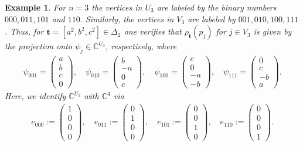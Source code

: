 \documentclass[a4paper]{amsart}
\newcommand{\C}{\mathbb{C}}
\newtheorem{example}[thm]{Example}
\begin{document}
\begin{example}
    \label{hyp::example:representation_rho_t_for_the_cube_Q3}
    For $n=3$ the vertices in $U_3$ are labeled by the binary numbers $000, 011, 101$ and $110$. Similarly, the vertices in $V_3$ are labeled by $001, 010, 100, 111$. Thus, for $\mathbf{t} = [a^2, b^2, c^2] \in \Delta_2$ one verifies that $\rho_\mathbf{t}(p_j)$ for $j \in V_3$ is given by the projection onto $\psi_j \in \C^{U_3}$, respectively, where
    \begin{align*}
        \psi_{001} = \begin{pmatrix}
            a \\ b \\ c \\ 0
        \end{pmatrix},
        \quad
        \psi_{010} = \begin{pmatrix}
            b \\ - a \\ 0 \\ c
        \end{pmatrix},
        \quad
        \psi_{100} = \begin{pmatrix}
            c \\ 0 \\ - a \\ - b
        \end{pmatrix},
        \quad
        \psi_{111} = \begin{pmatrix}
            0 \\ c \\ - b \\ a
        \end{pmatrix}.
    \end{align*}
    Here, we identify $\C^{U_3}$ with $\C^4$ via
    \begin{align*}
        e_{000} := \begin{pmatrix}
            1 \\ 0 \\ 0 \\ 0
        \end{pmatrix},
        \quad
        e_{011} := \begin{pmatrix}
            0 \\ 1 \\ 0 \\ 0
        \end{pmatrix},
        \quad
        e_{101} := \begin{pmatrix}
            0 \\ 0 \\ 1 \\ 0
        \end{pmatrix},
        \quad
        e_{110} := \begin{pmatrix}
            0 \\ 0 \\ 0 \\ 1
        \end{pmatrix}.
    \end{align*}
\end{example}
\end{document}
